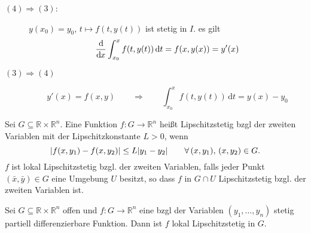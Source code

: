 \begin{beweis}
	\begin{description}
		\item[$(4) \Rightarrow (3)$:]$y(x_0)=y_0$, $t \mapsto f(t,y(t))$ ist stetig in $I$. es gilt
		\[
			\frac{\mathrm{d}\mkern-1.0mu }{\mathrm{d}\mkern-1.0mu x}  \int_{x_0}^{x}f(t,y(t)) \,\mathrm{d}t = f(x,y(x)) = y'(x)
		\] 
		\item[$(3) \Rightarrow (4)$] \[
			y'(x) = f(x,y) \qquad \Rightarrow \qquad \int_{x_0}^{x} f(t,y(t)) \,\mathrm{d}t = y(x) - y_0
		\]
	\end{description}
\end{beweis}
\begin{definition*}
	Sei $G \subseteq \mathbb{R}\times \mathbb{R}^n$. Eine Funktion $f : G \to \mathbb{R}^n$ heißt Lipschitzstetig bzgl der zweiten Variablen mit der Lipschitzkonstante $L>0$, wenn
	\[
		\lvert f(x,y_1)-f(x,y_2)\rvert \leq L \lvert y_1-y_2\rvert \qquad \forall\, (x,y_1), \,(x,y_2) \in G.
	\]
	$f$ ist lokal Lipschitzstetig bzgl. der zweiten Variablen, falls jeder Punkt $(\bar{x},\bar{y}) \in G$ eine Umgebung $U$ besitzt, so dass $f$ in $G \cap U$ Lipschitzstetig bzgl. der zweiten Variablen ist.
\end{definition*}

\begin{bemerkung}
	Sei $G \subseteq \mathbb{R} \times \mathbb{R}^n$ offen und $f: G \to  \mathbb{R}^n$ eine bzgl der Variablen $(y_1, \dots, y_n)$ stetig partiell differenzierbare Funktion. Dann ist $f$ lokal Lipschitzstetig in $G$.
\end{bemerkung}

